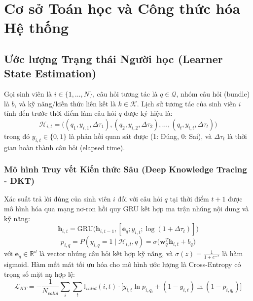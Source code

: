 \section{Cơ sở Toán học và Công thức hóa Hệ thống}\label{sec:toan-hoc}

\subsection{Ước lượng Trạng thái Người học (Learner State Estimation)}\label{subsec:state-estimation}
Gọi sinh viên là $i \in \{1, \dots, N\}$, câu hỏi tương tác là $q \in \mathcal{Q}$, nhóm câu hỏi (bundle) là $b$, và kỹ năng/kiến thức liên kết là $k \in \mathcal{K}$. Lịch sử tương tác của sinh viên $i$ tính đến trước thời điểm làm câu hỏi $q$ được ký hiệu là:
\begin{equation}\label{eq:history}
  \mathcal{H}_{i, t} = \big( (q_1, y_{i,1}, \Delta \tau_1), (q_2, y_{i,2}, \Delta \tau_2), \dots, (q_t, y_{i,t}, \Delta \tau_t) \big)
\end{equation}
trong đó $y_{i,t} \in \{0, 1\}$ là phản hồi quan sát được (1: Đúng, 0: Sai), và $\Delta \tau_t$ là thời gian hoàn thành câu hỏi (elapsed time).

\subsubsection{Mô hình Truy vết Kiến thức Sâu (Deep Knowledge Tracing - DKT)}
Xác suất trả lời đúng của sinh viên $i$ đối với câu hỏi $q$ tại thời điểm $t+1$ được mô hình hóa qua mạng nơ-ron hồi quy GRU kết hợp ma trận nhúng nội dung và kỹ năng:
\begin{equation}\label{eq:gru-kt}
  \mathbf{h}_{i, t} = \text{GRU}\big(\mathbf{h}_{i, t-1}, [\mathbf{e}_q; y_{i, t}; \log(1 + \Delta \tau_t)]\big)
\end{equation}
\begin{equation}\label{eq:prob-correct}
  p_{i, q} = P(y_{i, q} = 1 \mid \mathcal{H}_{i, t}, q) = \sigma\big(\mathbf{w}_q^T \mathbf{h}_{i, t} + b_q\big)
\end{equation}
với $\mathbf{e}_q \in \mathbb{R}^d$ là vector nhúng câu hỏi kết hợp kỹ năng, và $\sigma(z) = \frac{1}{1 + e^{-z}}$ là hàm sigmoid. Hàm mất mát tối ưu hóa cho mô hình ước lượng là Cross-Entropy có trọng số mặt nạ hợp lệ:
\begin{equation}\label{eq:loss-kt}
  \mathcal{L}_{KT} = - \frac{1}{N_{valid}} \sum_{i} \sum_{t} \mathbb{I}_{valid}(i,t) \cdot \big[ y_{i,t} \ln p_{i,q_t} + (1 - y_{i,t}) \ln (1 - p_{i,q_t}) \big]
\end{equation}

